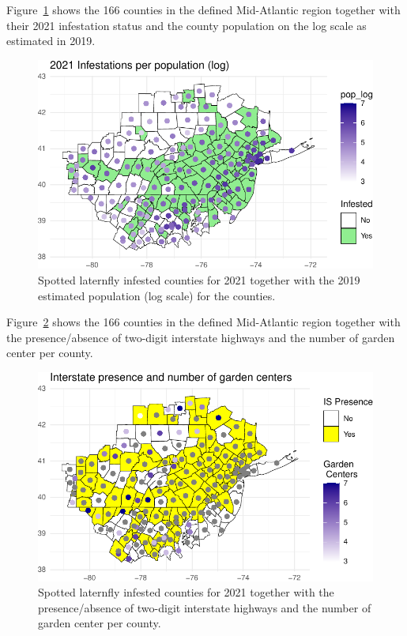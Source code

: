 \documentclass[
  letterpaper,
  DIV=11,
  numbers=noendperiod]{scrartcl}
\begin{document}
Figure~\ref{fig-figure-5} shows the 166 counties in the defined
Mid-Atlantic region together with their 2021 infestation status and the
county population on the log scale as estimated in 2019.

\begin{figure}

{\centering \includegraphics{revisions_statistical_analysis_files/figure-pdf/fig-figure-5-1.pdf}

}

\caption{\label{fig-figure-5}Spotted laternfly infested counties for
2021 together with the 2019 estimated population (log scale) for the
counties.}

\end{figure}

Figure~\ref{fig-figure-6} shows the 166 counties in the defined
Mid-Atlantic region together with the presence/absence of two-digit
interstate highways and the number of garden center per county.

\begin{figure}

{\centering \includegraphics{revisions_statistical_analysis_files/figure-pdf/fig-figure-6-1.pdf}

}

\caption{\label{fig-figure-6}Spotted laternfly infested counties for
2021 together with the presence/absence of two-digit interstate highways
and the number of garden center per county.}

\end{figure}
\end{document}
